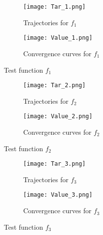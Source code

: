 \begin{comment}
In line with \cite{yang2022}, we consider the following specification of the loss function $f(\vec{x},\vec{r})$ such that
$
f(\vec{x},\vec{r})=-\lambda_1m_1(\vec{x},\vec{r})+\lambda_2m_2(\vec{x},\vec{r})+...+(-1)^d\lambda_dm_d(\vec{x},\vec{r})$, where $m_1(\vec{x},\vec{r})=\vec{x}^{\top}\vec{r}$ and $m_i(\vec{x},\vec{r})=\left(m_1(\vec{x},\vec{r})-\mathbb{E}\left(m_1(\vec{x},\vec{r})\right)\right)^i$, for $i=2,...,d$.
\end{comment}

\begin{figure}[H]
\centering
\begin{subfigure}[b]{0.3\textwidth}
    \centering
    \texttt{[image: Tar\_1.png]}
    \caption{Trajectories for $f_1$}
    \label{f1_trajectories}
\end{subfigure}
\begin{subfigure}[b]{0.3\textwidth}
    \centering
    \texttt{[image: Value\_1.png]}
    \caption{Convergence curves for $f_1$}
    \label{f1_convergence}
\end{subfigure}
\caption{Test function $f_1$}
\label{f_1}
\end{figure}

\begin{figure}[H]
\centering
\begin{subfigure}[b]{0.3\textwidth}
    \centering
    \texttt{[image: Tar\_2.png]}
    \caption{Trajectories for $f_2$}
    \label{f2_trajectories}
\end{subfigure}
\begin{subfigure}[b]{0.3\textwidth}
    \centering
    \texttt{[image: Value\_2.png]}
    \caption{Convergence curves for $f_2$}
    \label{f2_convergence}
\end{subfigure}
\caption{Test function $f_2$}
\label{f_2}
\end{figure}

\begin{figure}[H]
\centering
\begin{subfigure}[b]{0.3\textwidth}
    \centering
    \texttt{[image: Tar\_3.png]}
    \caption{Trajectories for $f_3$}
    \label{f3_trajectories}
\end{subfigure}
\begin{subfigure}[b]{0.3\textwidth}
    \centering
    \texttt{[image: Value\_3.png]}
    \caption{Convergence curves for $f_3$}
    \label{f3_convergence}
\end{subfigure}
\caption{Test function $f_3$}
\label{f_3}
\end{figure}

